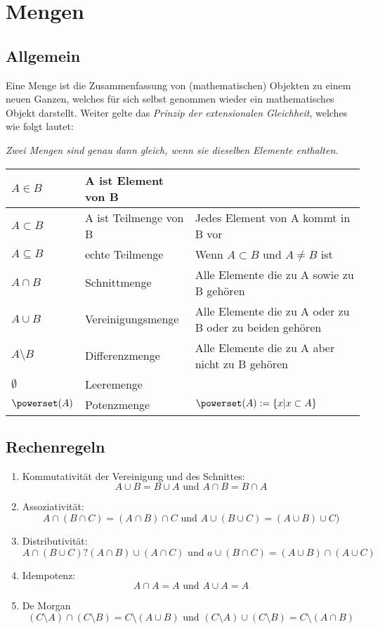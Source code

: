 \chapter{Mengen}
\section{Allgemein}
Eine Menge ist die Zusammenfassung von (mathematischen) Objekten zu einem neuen Ganzen, welches für sich selbst genommen wieder ein mathematisches Objekt darstellt. Weiter gelte das \emph{Prinzip der extensionalen Gleichheit}, welches wie folgt lautet:
\par \hspace*{10mm} \emph{Zwei Mengen sind genau dann gleich, wenn sie dieselben Elemente enthalten.}

\begin{longtable}{|p{}|p{}|p{}|}
	\hline
	\( A \in B \) & A ist Element von B & \\
	\hline
	\( A \subset B \) & A ist Teilmenge von B & Jedes Element von A kommt in B vor \\
	\hline
	\( A \subseteq B \) & echte Teilmenge & Wenn \(A \subset B \) und \(A \neq B \) ist \\
	\hline
	\( A \cap B \) & Schnittmenge & Alle Elemente die zu A sowie zu B gehören \\
	\hline
	\( A \cup B \) & Vereinigungsmenge & Alle Elemente die zu A oder zu B oder zu beiden gehören \\
	\hline
	\( A \setminus B \) & Differenzmenge & Alle Elemente die zu A aber nicht zu B gehören \\
	\hline
	\( \emptyset \) & Leeremenge & \\
	\hline
	\( \powerset(A) \) & Potenzmenge & \( \powerset(A) := \{x|x \subset A\} \) \\
	\hline
\end{longtable}

\section{Rechenregeln}
\begin{enumerate}
	\item Kommutativität der Vereinigung und des Schnittes:
		$$ A \cup B = B \cup A \text{ und } A \cap B = B \cap A$$
	\item Assoziativität: 
		$$ A \cap (B \cap C) = (A \cap B) \cap C  \text{ und }  A \cup (B \cup C) = (A \cup B) \cup C) $$
	\item Distributivität:
		$$ A \cap (B \cup C) ? (A \cap B) \cup (A \cap C)  \text{ und } a \cup (B \cap C) = (A \cup B) \cap (A \cup C)$$
	\item Idempotenz: 
		$$ A \cap A = A  \text{ und }  A \cup A = A$$
	\item De Morgan
	$$(C\setminus A)\cap (C\setminus B) = C\setminus (A \cup B)  \text{ und } (C\setminus A) \cup (C \setminus B) = C\setminus (A \cap B)$$
\end{enumerate}
